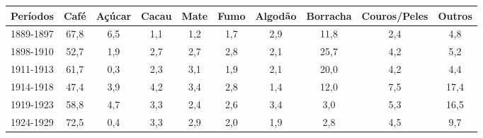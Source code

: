 \begin{table}[!htp]
{
\begin{minipage}{21cm}
\begin{tabular}{cccccccccc}
\hline
Períodos & Café & Açúcar & Cacau & Mate & Fumo & Algodão & Borracha & Couros/Peles & Outros \\
\hline\hline
1889-1897 & 67,8 & 6,5 & 1,1 & 1,2 & 1,7 & 2,9 & 11,8 & 2,4 & 4,8 \\
1898-1910 & 52,7 & 1,9 & 2,7 & 2,7 & 2,8 & 2,1 & 25,7 & 4,2 & 5,2 \\
1911-1913 & 61,7 & 0,3 & 2,3 & 3,1 & 1,9 & 2,1 & 20,0 & 4,2 & 4,4 \\
1914-1918 & 47,4 & 3,9 & 4,2 & 3,4 & 2,8 & 1,4 & 12,0 & 7,5 & 17,4 \\
1919-1923 & 58,8 & 4,7 & 3,3 & 2,4 & 2,6 & 3,4 & 3,0 & 5,3 & 16,5 \\
1924-1929 & 72,5 & 0,4 & 3,3 & 2,9 & 2,0 & 1,9 & 2,8 & 4,5 & 9,7 \\
\hline
\end{tabular} 
\end{minipage}
}
{  }
\end{table}